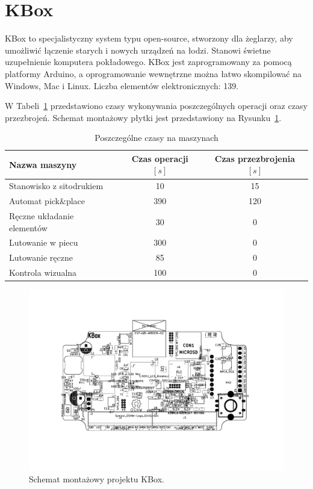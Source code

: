 \section{KBox}
KBox to specjalistyczny system typu open-source, stworzony dla żeglarzy, aby umożliwić łączenie starych i nowych urządzeń na łodzi. Stanowi świetne uzupełnienie komputera pokładowego. KBox jest zaprogramowany za pomocą platformy Arduino, a oprogramowanie wewnętrzne można łatwo skompilować na Windows, Mac i Linux.
Liczba elementów elektronicznych: 139.

\breakparagraph{}
W Tabeli~\ref{kbox:tab} przedstawiono czasy wykonywania poszczególnych operacji oraz czasy przezbrojeń. Schemat montażowy płytki jest przedstawiony na Rysunku~\ref{kbox:sche}.

\begin{table}[H]
	\centering
	\caption{Poszczególne czasy na maszynach}
	\begin{tabular}{lcc}
		\toprule
		Nazwa maszyny                 & Czas operacji $[s]$ & Czas przezbrojenia $[s]$ \\
		\midrule
		Stanowisko z sitodrukiem      & 10                  & 15                       \\
		Automat pick\&place           & 390                 & 120                      \\
		Ręczne układanie elementów & 30                  & 0                        \\
		Lutowanie w piecu             & 300                 & 0                        \\
		Lutowanie ręczne             & 85                  & 0                        \\
		Kontrola wizualna             & 100                 & 0                        \\
		\bottomrule
	\end{tabular}
	\label{kbox:tab}
\end{table}

\begin{figure}[H]
	\centering
	\includegraphics[scale=0.7,clip, trim=3.8cm 4cm 3.8cm 3cm]{chapters/chapter5/kbox-rotated.pdf}
	\caption{Schemat montażowy projektu KBox.}
	\label{kbox:sche}
\end{figure}

